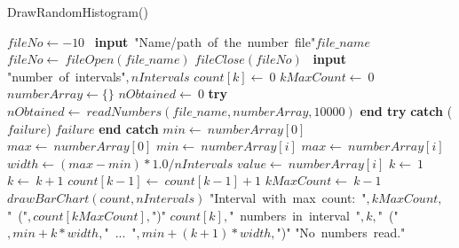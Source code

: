 \documentclass[a4paper,10pt]{article}
\begin{document}
\begin{algorithm}
\caption{DrawRandomHistogram()}
\begin{algorithmic}[5]

\STATE {}
\STATE {}
  \STATE \(fileNo\gets-10\)
  \REPEAT
    \STATE\ \textbf{input}\ \(\)"{}Name/path\ of\ the\ number\ file"{}\(file\_name\)
    \STATE \(fileNo\gets\ fileOpen(file\_name)\)
    \STATE \(fileClose(fileNo)\)
    \STATE\ \textbf{input}\ \(\)"{}number\ of\ intervals"{}\(,nIntervals\)
      \STATE \(count[k]\gets\ 0\)
    \ENDFOR
    \STATE \(kMaxCount\gets\ 0\)
    \STATE \(numberArray\gets\{\}\)
    \STATE \(nObtained\gets\ 0\)
    \STATE \textbf{try}  \BODY
      \STATE \(nObtained\gets\ readNumbers(file\_name,numberArray,10000)\)
    \ENDBODY \STATE \textbf{end try}
    \STATE \textbf{catch} (\(failure\)) \BODY
      \PRINT\(failure\)
    \ENDBODY \STATE \textbf{end catch}
      \STATE \(min\gets\ numberArray[0]\)
      \STATE \(max\gets\ numberArray[0]\)
          \STATE \(min\gets\ numberArray[i]\)
        \ELSE
            \STATE \(max\gets\ numberArray[i]\)
          \ENDIF
        \ENDIF
      \ENDFOR
      \STATE \(width\gets(max-min)*1.0/nIntervals\)
        \STATE \(value\gets\ numberArray[i]\)
        \STATE \(k\gets\ 1\)
          \STATE \(k\gets\ k+1\)
        \ENDWHILE
        \STATE \(count[k-1]\gets\ count[k-1]+1\)
          \STATE \(kMaxCount\gets\ k-1\)
        \ENDIF
      \ENDFOR
      \STATE \(drawBarChart(count,nIntervals)\)
      \PRINT\(\)"{}Interval\ with\ max\ count:\ "{}\(,kMaxCount,\)"{}\ ("{}\(,count[kMaxCount],\)"{})"{}\(\)
        \PRINT\(count[k],\)"{}\ numbers\ in\ interval\ "{}\(,k,\)"{}\ ("{}\(,min+k*width,\)"{}\ ...\ "{}\(,min+(k+1)*width,\)"{})"{}\(\)
      \ENDFOR
    \ELSE
      \PRINT\(\)"{}No\ numbers\ read."{}\(\)
    \ENDIF
  \ENDIF

\end{algorithmic}
\end{algorithm}
\end{document}

